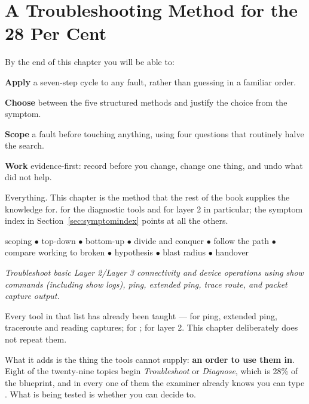 \chapter{A Troubleshooting Method for the 28 Per Cent}\label{ch:tshootmethod}

\begin{outcomes}
By the end of this chapter you will be able to:
\begin{tight}
  \item \textbf{Apply} a seven-step cycle to any fault, rather than guessing in a
        familiar order.
  \item \textbf{Choose} between the five structured methods and justify the
        choice from the symptom.
  \item \textbf{Scope} a fault before touching anything, using four questions
        that routinely halve the search.
  \item \textbf{Work} evidence-first: record before you change, change one thing,
        and undo what did not help.
\end{tight}
\end{outcomes}

\begin{prereq}
Everything. This chapter is the method that the rest of the book supplies the
knowledge for.  for the diagnostic tools and 
for layer 2 in particular; the symptom index in Section~\ref{sec:symptomindex} points at all the
others.
\end{prereq}

\begin{keyterms}
scoping $\bullet$ top-down $\bullet$ bottom-up $\bullet$ divide and conquer
$\bullet$ follow the path $\bullet$ compare working to broken $\bullet$
hypothesis $\bullet$ blast radius $\bullet$ handover
\end{keyterms}

\begin{examnote}
\emph{Troubleshoot basic Layer 2/Layer 3 connectivity and device operations using
show commands (including show logs), ping, extended ping, trace route, and packet
capture output.}

Every tool in that list has already been taught ---  for ping,
extended ping, traceroute and reading captures;  for
;  for layer 2. This chapter deliberately does
not repeat them.

What it adds is the thing the tools cannot supply: \textbf{an order to use them
in}. Eight of the twenty-nine topics begin \emph{Troubleshoot} or
\emph{Diagnose}, which is 28\% of the blueprint, and in every one of them the
examiner already knows you can type . What is being
tested is whether you can decide to.
\end{examnote}

